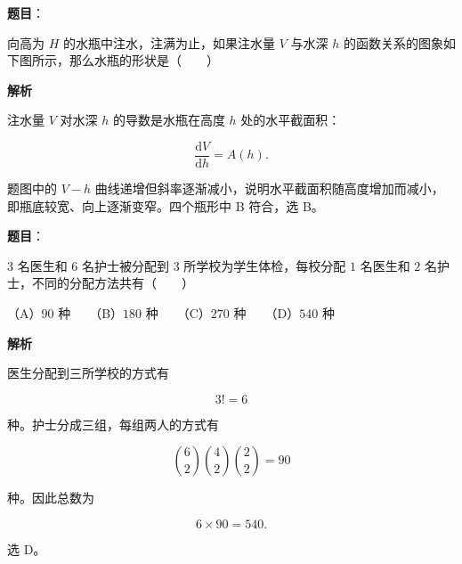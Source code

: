 \begin{answer}

\textbf{题目}：

向高为 $H$ 的水瓶中注水，注满为止，如果注水量 $V$ 与水深 $h$ 的函数关系的图象如下图所示，那么水瓶的形状是\mbox{（　　）}
\nopagebreak[4]
\begin{center}\end{center}
\nopagebreak[4]
\textbf{解析}

注水量 $V$ 对水深 $h$ 的导数是水瓶在高度 $h$ 处的水平截面积：

\nopagebreak[4]
\[
\frac{\mathrm dV}{\mathrm dh}=A(h).
\]

题图中的 $V-h$ 曲线递增但斜率逐渐减小，说明水平截面积随高度增加而减小，即瓶底较宽、向上逐渐变窄。四个瓶形中 B 符合，选 B。


\end{answer}
\begin{answer}

\textbf{题目}：

$3$ 名医生和 $6$ 名护士被分配到 $3$ 所学校为学生体检，每校分配 $1$ 名医生和 $2$ 名护士，不同的分配方法共有\mbox{（　　）}

（A）$90$ 种　　（B）$180$ 种　　（C）$270$ 种　　（D）$540$ 种

\textbf{解析}

医生分配到三所学校的方式有

\nopagebreak[4]
\[
3!=6
\]

种。护士分成三组，每组两人的方式有

\nopagebreak[4]
\[
\binom62\binom42\binom22=90
\]

种。因此总数为

\nopagebreak[4]
\[
6\times90=540.
\]

选 D。


\end{answer}
